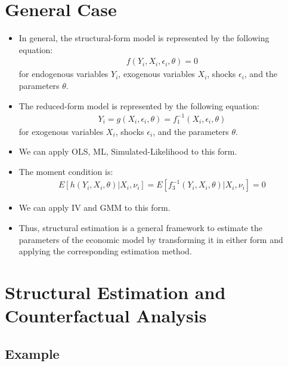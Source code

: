 \documentclass[
]{book}
\providecommand{\tightlist}{%
  \setlength{\itemsep}{0pt}\setlength{\parskip}{0pt}}
\begin{document}
\hypertarget{general-case}{%
\section{General Case}\label{general-case}}

\begin{itemize}
\tightlist
\item
  In general, the structural-form model is represented by the following equation:
  \begin{align}
    f(Y_i, X_i, \epsilon_i, \theta) = 0
  \end{align}
  for endogenous variables \(Y_i\), exogenous variables \(X_i\), shocks \(\epsilon_i\), and the parameters \(\theta\).
\item
  The reduced-form model is represented by the following equation:
  \begin{align}
    Y_i = g(X_i, \epsilon_i, \theta) = f_1^{-1}(X_i, \epsilon_i, \theta)
  \end{align}
  for exogenous variables \(X_i\), shocks \(\epsilon_i\), and the parameters \(\theta\).
\item
  We can apply OLS, ML, Simulated-Likelihood to this form.
\item
  The moment condition is:
  \begin{align}
    E[h(Y_i, X_i, \theta) | X_i, \nu_i] = E[f_3^{-1}(Y_i, X_i, \theta) | X_i, \nu_i] = 0
  \end{align}
\item
  We can apply IV and GMM to this form.
\item
  Thus, structural estimation is a general framework to estimate the parameters of the economic model by transforming it in either form and applying the corresponding estimation method.
\end{itemize}

\hypertarget{structural-estimation-and-counterfactual-analysis}{%
\section{Structural Estimation and Counterfactual Analysis}\label{structural-estimation-and-counterfactual-analysis}}

\hypertarget{example}{%
\subsection{Example}\label{example}}
\end{document}
